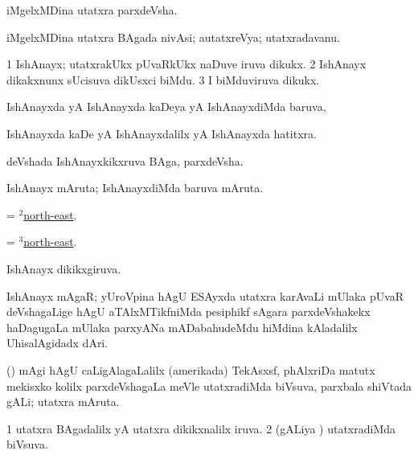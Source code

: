 \bentry
{}
\gl{\nA}
\bmng
iMgelxMDina utatxra parxdeVsha. 
\emng
\eentry

\bentry
{}
\gl{\nA}
\bmng
iMgelxMDina utatxra BAgada nivAsi; autatxreVya; utatxradavanu. 
\emng
\eentry

\bentry
{}
\gl{\nA}
\bmng
\bnum
\num{1} IshAnayx; utatxrakUkx pUvaRkUkx naDuve iruva dikukx. 
\num{2} IshAnayx dikakxnunx sUcisuva dikUsxci biMdu. 
\num{3} I biMduviruva dikukx. 
\enum
\emng
\eentry

\bentry
{}
\gl{\gu}
\bmng
IshAnayxda yA IshAnayxda kaDeya yA IshAnayxdiMda baruva, 
\emng
\eentry

\bentry
{}
\gl{\kirxvi}
\bmng
IshAnayxda kaDe yA IshAnayxdalilx yA IshAnayxda hatitxra. 
\emng
\eentry

\bentry
{}
\gl{\nA}
\bmng
deVshada IshAnayxkikxruva BAga, parxdeVsha. 
\emng
\eentry

\bentry
{}
\gl{\nA}
\bmng
IshAnayx mAruta; IshAnayxdiMda baruva mAruta. 
\emng
\eentry

\bentry
{}
\gl{\gu}
\bmng
= \hyperlink{north-east(2)}{$^2$north-east}. 
\emng
\eentry

\bentry
{}
\gl{\kirxvi}
\bmng
= \hyperlink{north-east(3)}{$^3$north-east}. 
\emng
\eentry

\bentry
{}
\gl{\gu}
\bmng
IshAnayx dikikxgiruva. 
\emng
\eentry

\bentry
{}
\gl{\nA}
\bmng
IshAnayx mAgaR; yUroVpina hAgU ESAyxda utatxra karAvaLi mUlaka pUvaR deVshagaLige hAgU aTAlxMTikfniMda pesiphikf sAgara parxdeVshakekx haDagugaLa mUlaka parxyANa mADabahudeMdu hiMdina kAladalilx UhisalAgidadx dAri. 
\emng
\eentry

\bentry
{}
\gl{\nA}
\bmng
(\ame) mAgi hAgU caLigAlagaLalilx (amerikada) TekAsxsf, phAlxriDa matutx mekisxko kolilx parxdeVshagaLa meVle utatxradiMda biVsuva, parxbala shiVtada gALi; utatxra mAruta. 
\emng
\eentry

\bentry
{}
\gl{\gu}
\bmng
\bnum
\num{1} utatxra BAgadalilx yA utatxra dikikxnalilx iruva. 
\num{2} (gALiya \vi) utatxradiMda biVsuva. 
\enum
\emng
\eentry


